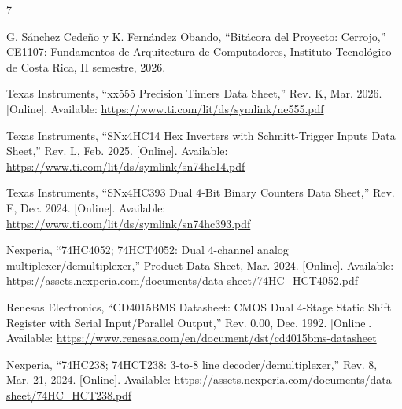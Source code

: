 \documentclass[10pt,journal]{IEEEtran}
\begin{document}
\begin{thebibliography}{7}

G. Sánchez Cedeño y K. Fernández Obando, ``Bitácora del Proyecto: Cerrojo,'' CE1107: Fundamentos de Arquitectura de Computadores, Instituto Tecnológico de Costa Rica, II semestre, 2026.

Texas Instruments, ``xx555 Precision Timers Data Sheet,'' Rev. K, Mar. 2026. [Online]. Available: \url{https://www.ti.com/lit/ds/symlink/ne555.pdf}

Texas Instruments, ``SNx4HC14 Hex Inverters with Schmitt-Trigger Inputs Data Sheet,'' Rev. L, Feb. 2025. [Online]. Available: \url{https://www.ti.com/lit/ds/symlink/sn74hc14.pdf}

Texas Instruments, ``SNx4HC393 Dual 4-Bit Binary Counters Data Sheet,'' Rev. E, Dec. 2024. [Online]. Available: \url{https://www.ti.com/lit/ds/symlink/sn74hc393.pdf}

Nexperia, ``74HC4052; 74HCT4052: Dual 4-channel analog multiplexer/demultiplexer,'' Product Data Sheet, Mar. 2024. [Online]. Available: \url{https://assets.nexperia.com/documents/data-sheet/74HC_HCT4052.pdf}

Renesas Electronics, ``CD4015BMS Datasheet: CMOS Dual 4-Stage Static Shift Register with Serial Input/Parallel Output,'' Rev. 0.00, Dec. 1992. [Online]. Available: \url{https://www.renesas.com/en/document/dst/cd4015bms-datasheet}

Nexperia, ``74HC238; 74HCT238: 3-to-8 line decoder/demultiplexer,'' Rev. 8, Mar. 21, 2024. [Online]. Available: \url{https://assets.nexperia.com/documents/data-sheet/74HC_HCT238.pdf}

\end{thebibliography}
\end{document}
